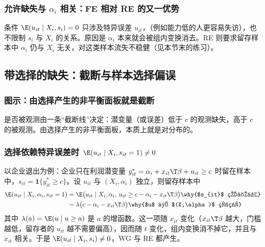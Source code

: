 \subsubsection{允许缺失与 \texorpdfstring{$\alpha_i$}{alpha\_i} 相关：FE 相对 RE 的又一优势}

条件 $\E(u_{it}\mid X_i,s_i)=0$ 只涉及特异误差 $u_{it}$，（例如能力低的人更容易失访），也不限制 $s_i$ 与 $X_i$ 的关系。原因是 $\alpha_i$ 本来就会被组内变换消去。RE 则要求留存样本中 $\alpha_i$ 仍与 $X_i$ 无关，对这类样本流失不稳健（见本节末的练习）。

\subsection{带选择的缺失：截断与样本选择偏误}

\subsubsection{图示：由选择产生的非平衡面板就是截断}

\begin{center}
\end{center}
是否被观测由一条“截断线”决定：潜变量（或误差）低于 $c$ 的观测缺失，高于 $c$ 的被观测。由选择产生的非平衡面板，本质上就是对分布的。

\subsubsection{选择依赖特异误差时 \texorpdfstring{$\E(u_{it}\mid X_i,s_{it}=1)\neq0$}{E(u | X, s=1) != 0}}

以企业退出为例：企业只在利润潜变量 $y_{it}^*=\alpha_i+x_{it}\T\beta+u_{it}\ge c$ 时留在样本中，$s_{it}=\mathbf{1}\{y_{it}^*\ge c\}$。设 $u_{it}$ 与 $(X_i,\alpha_i)$ 独立，则留存样本中
\begin{align*}
\E(u_{it}\mid X_i,\alpha_i,s_{it}=1) &= \E\bigl(u_{it}\mid X_i,\alpha_i,\,u_{it}\ge c-\alpha_i-x_{it}\T\beta\bigr) \why{$s_{it}$ 的定义}\\
&= \lambda\bigl(c-\alpha_i-x_{it}\T\beta\bigr) \why{$u$ 与 $(X,\alpha)$ 独立}
\end{align*}
其中 $\lambda(a)=\E(u\mid u\ge a)$ 是 $a$ 的增函数。这一项随 $x_{it}$ 变化（$x_{it}\T\beta$ 越大，门槛越低，留存者的 $u_{it}$ 越不需要偏高），因而随 $t$ 变化，组内变换消不掉它，并且与 $\dot x_{it}$ 相关。于是 $\E(u_{it}\mid X_i,s_i)\neq0$，WG 与 RE 都产生。

